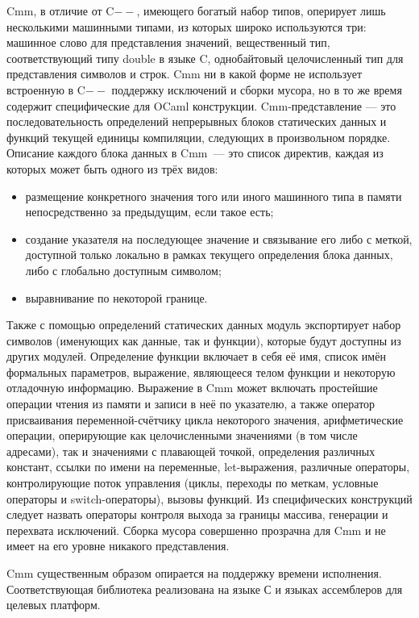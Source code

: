 \documentclass[a4paper, 12pt]{article}
\begin{document}
Cmm, в отличие от C$--$, имеющего богатый набор типов, оперирует лишь несколькими машинными типами, из которых широко
используются три: машинное слово для представления значений, вещественный тип, соответствующий типу double в языке C,
однобайтовый целочисленный тип для представления символов и строк. Cmm ни в какой форме не использует встроенную в C$--$
поддержку исключений и сборки мусора, но в то же время содержит специфические для OCaml конструкции. Cmm-представление
--- это последовательность определений непрерывных блоков статических данных и функций текущей единицы компиляции,
следующих в произвольном порядке. Описание каждого блока данных в Cmm~--- это список директив, каждая из которых может
быть одного из трёх видов:
\begin{itemize}
  \item размещение конкретного значения того или иного машинного типа в памяти непосредственно за предыдущим, если такое
есть;
  \item создание указателя на последующее значение и связывание его либо с меткой, доступной только локально в рамках
текущего определения блока данных, либо с глобально доступным символом;
  \item выравнивание по некоторой границе.
\end{itemize}
Также с помощью определений статических данных модуль экспортирует набор символов (именующих как данные, так и функции),
которые будут доступны из других модулей. Определение функции включает в себя её имя, список имён формальных параметров,
выражение, являющееся телом функции и некоторую отладочную информацию. Выражение в Cmm может включать простейшие
операции чтения из памяти и записи в неё по указателю, а также оператор присваивания переменной-счётчику цикла
некоторого значения, арифметические операции, оперирующие как целочисленными значениями (в том числе адресами), так и
значениями с плавающей точкой, определения различных констант, ссылки по имени на переменные, let-выражения, различные
операторы, контролирующие поток управления (циклы, переходы по меткам, условные операторы и switch-операторы), вызовы
функций. Из специфических конструкций следует назвать операторы контроля выхода за границы массива, генерации и
перехвата исключений. Сборка мусора совершенно прозрачна для Cmm и не имеет на его уровне никакого представления.

Cmm существенным образом опирается на поддержку времени исполнения. Соответствующая библиотека реализована на языке С и
языках ассемблеров для целевых платформ.
\end{document}
